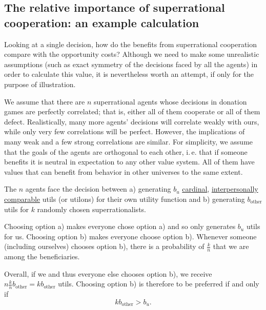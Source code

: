 \hypertarget{the-relative-importance-of-superrational-cooperation-an-example-calculation}{\subsection{The
relative importance of superrational cooperation: an example
calculation}\label{the-relative-importance-of-superrational-cooperation-an-example-calculation}}

Looking at a single decision, how do the benefits from superrational
cooperation compare with the opportunity costs? Although we need to make
some unrealistic assumptions (such as exact symmetry of the decisions
faced by all the agents) in order to calculate this value, it is
nevertheless worth an attempt, if only for the purpose of illustration.

We assume that there are \(n\) superrational agents whose decisions in
donation games are perfectly correlated; that is, either all of them
cooperate or all of them defect. Realistically, many more agents'
decisions will correlate weakly with ours, while only very few
correlations will be perfect. However, the implications of many weak and
a few strong correlations are similar. For simplicity, we assume that
the goals of the agents are orthogonal to each other, i.\,e. that if
someone benefits it is neutral in expectation to any other value system.
All of them have values that can benefit from behavior in other
universes to the same extent.

The \(n\) agents face the decision between a) generating \(b_{u}\)
\href{https://en.wikipedia.org/wiki/Cardinal_utility}{cardinal},
\href{https://en.wikipedia.org/wiki/Social_choice_theory\#Interpersonal_utility_comparison}{interpersonally
comparable} utils (or utilons) for their own utility function and b)
generating \(b_{\text{other}}\) utils for \(k\) randomly chosen
superrationalists.

Choosing option a) makes everyone chose option a) and so only generates
\(b_{u}\) utils for us. Choosing option b) makes everyone choose option
b). Whenever someone (including ourselves) chooses option b), there is a
probability of \(\frac{k}{n}\) that we are among the beneficiaries.

Overall, if we and thus everyone else chooses option b), we receive \(n\frac{k}{n}b_{\text{other}} =
kb_{\text{other}}\) utils. Choosing option b) is therefore to be preferred if and only if
\begin{equation}
kb_{\text{other}} > b_{u}.
    \label{eq:preferred}
\end{equation}

